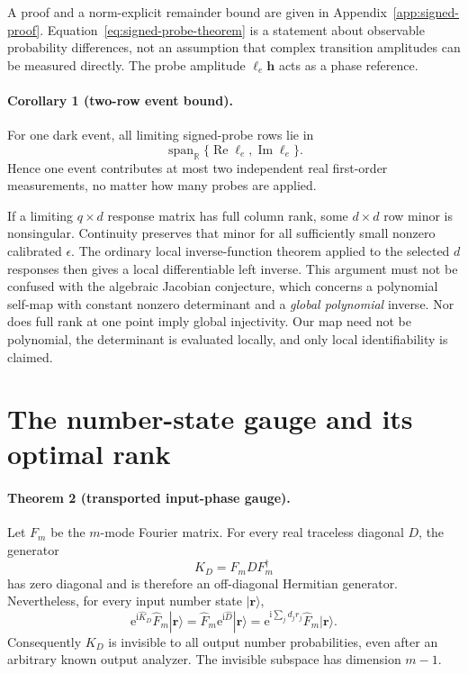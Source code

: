 \documentclass[aps,pra,reprint,amsmath,amssymb,superscriptaddress,longbibliography]{revtex4-2}
\newcommand{\ii}{\mathrm{i}}
\newcommand{\ee}{\mathrm{e}}
\begin{document}
A proof and a norm-explicit remainder bound are given in
Appendix~\ref{app:signed-proof}.  Equation~\eqref{eq:signed-probe-theorem}
is a statement about observable probability differences, not an assumption
that complex transition amplitudes can be measured directly.  The probe
amplitude $\ell_e\bm h$ acts as a phase reference.

\paragraph*{Corollary 1 (two-row event bound).}
For one dark event, all limiting signed-probe rows lie in
\begin{equation}
 \operatorname{span}_{\mathbb R}
 \{\operatorname{Re}\ell_e,\operatorname{Im}\ell_e\}.
\label{eq:two-row-span}
\end{equation}
Hence one event contributes at most two independent real first-order
measurements, no matter how many probes are applied.

If a limiting $q\times d$ response matrix has full column rank, some
$d\times d$ row minor is nonsingular.  Continuity preserves that minor for
all sufficiently small nonzero calibrated $\epsilon$.  The ordinary local
inverse-function theorem applied to the selected $d$ responses then gives a
local differentiable left inverse.  This argument must not be confused with
the algebraic Jacobian conjecture, which concerns a polynomial self-map with
constant nonzero determinant and a \emph{global polynomial} inverse.  Nor
does full rank at one point imply global injectivity.  Our map need not be
polynomial, the determinant is evaluated locally, and only local
identifiability is claimed.

\section{The number-state gauge and its optimal rank}
\label{sec:fock-gauge}

\paragraph*{Theorem 2 (transported input-phase gauge).}
Let $F_m$ be the $m$-mode Fourier matrix.  For every real traceless diagonal
$D$, the generator
\begin{equation}
 K_D=F_mDF_m^\dagger
\label{eq:transported-gauge}
\end{equation}
has zero diagonal and is therefore an off-diagonal Hermitian generator.
Nevertheless, for every input number state $|\bm r\rangle$,
\begin{equation}
 \ee^{\ii\widehat K_D}\widehat F_m|\bm r\rangle
 =\widehat F_m\ee^{\ii\widehat D}|\bm r\rangle
 =\ee^{\ii\sum_jd_jr_j}\widehat F_m|\bm r\rangle .
\label{eq:gauge-no-go}
\end{equation}
Consequently $K_D$ is invisible to all output number probabilities, even
after an arbitrary known output analyzer.  The invisible subspace has
dimension $m-1$.
\end{document}
